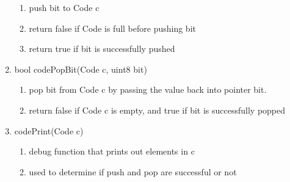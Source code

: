 \documentclass[11pt]{article}
\begin{document}
\begin{enumerate}
\begin{enumerate}
	\item push bit to Code c
	\item return false if Code is full before pushing bit
	\item return true if bit is successfully pushed
	\end{enumerate}
\item bool codePopBit(Code c, uint8 bit)
	\begin{enumerate}
	\item pop bit from Code c by passing the value back into pointer bit.
	\item return false if Code c is empty, and true if bit is successfully popped
	\end{enumerate}
\item codePrint(Code c)
	\begin{enumerate}
	\item debug function that prints out elements in c
	\item used to determine if push and pop are successful or not
	\end{enumerate}
\end{enumerate}
\end{document}
